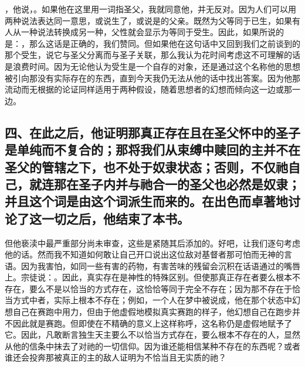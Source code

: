 ，他说，。如果他在这里用一词指圣父，我就同意他，并无反对。因为人们可以用两种说法表达同一意思，或说生了，或说是的父亲。既然为父等同于已生，如果有人从一种说法转换成另一种，父性就会显示为等同于受生。因此，如果所说的是：，那么这话是正确的，我们赞同。但如果他在这句话中又回到我们之前谈到的那个受生，说它与圣父分离而与圣子关联，那么我认为花时间考虑这不可理解的话是浪费时间。因为无论他认为受生是一个自存的对象，还是通过这个名称他的思想被引向那没有实际存在的东西，直到今天我仍无法从他的话中找出答案。因为他那流动而无根据的论证同样适用于两种假设，随着思想者的幻想而倾向这一边或那一边。\par


\subsection{四、在此之后，他证明那真正存在且在圣父怀中的圣子是单纯而不复合的；那将我们从束缚中赎回的主并不在圣父的管辖之下，也不处于奴隶状态；否则，不仅祂自己，就连那在圣子内并与祂合一的圣父也必然是奴隶；并且这个词是由这个词派生而来的。在出色而卓著地讨论了这一切之后，他结束了本书。}

但他亵渎中最严重部分尚未审查，这些是紧随其后添加的。好吧，让我们逐句考虑他的话。然而我不知道如何敢让自己开口说出这位敌对基督者那可怕而无神的言语。因为我害怕，如同一些有害的药物，有害苦味的残留会沉积在话语通过的嘴唇上。宗徒说：。因此，真实存在是神性的特殊区别。但使那真正存在者要么根本不存在，要么不是以恰当的方式存在，这恰恰等同于完全不存在；因为那不存在于恰当方式中者，实际上根本不存在；例如，一个人在梦中被说成，他在那个状态中幻想自己在赛跑中用力，但由于他虚假地模拟真实赛跑的样子，他幻想自己在跑步并不因此就是赛跑。但即使在不精确的意义上这样称呼，这名称仍是虚假地赋予了它。因此，凡敢断言独生天主要么不以恰当方式存在，要么根本不存在的人，显然从他的信条中抹去了对祂的一切信仰。因为谁还能相信某种不存在的东西呢？或者谁还会投奔那被真正的主的敌人证明为不恰当且无实质的祂？\par

